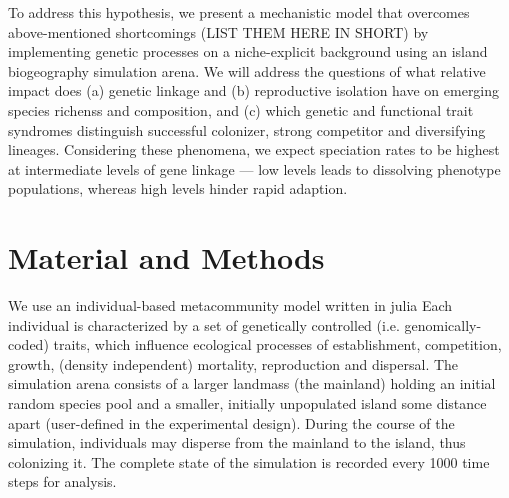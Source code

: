 \documentclass[a4paper]{scrartcl}
\begin{document}

To address this hypothesis, 
we present a mechanistic model that overcomes above-mentioned shortcomings (LIST THEM HERE IN SHORT)
by implementing genetic processes on a niche-explicit background
using an island biogeography simulation arena.%
We will address the questions of what relative impact does (a) genetic linkage and
(b) reproductive isolation have on emerging species richenss and composition,
and (c) which genetic and functional trait syndromes %
distinguish successful colonizer,
strong competitor and diversifying lineages.
Considering these phenomena, we expect speciation rates to be highest at intermediate levels of gene linkage --- low
levels leads to dissolving phenotype populations, whereas high levels hinder rapid adaption. %


\section{Material and Methods}
We use an individual-based metacommunity model written in julia %
Each individual is characterized by a set of genetically controlled (i.e. genomically-coded) traits,
which influence ecological processes of
establishment, competition, growth, (density independent) mortality, reproduction and dispersal.
The simulation arena consists of a larger landmass (the mainland) holding an initial random species pool and a smaller,
initially unpopulated island some distance apart (user-defined in the experimental design).
During the course of the simulation, individuals may disperse from the mainland to the island, thus colonizing it. 
The complete state of the simulation is recorded every 1000 time steps for analysis.
\end{document}
